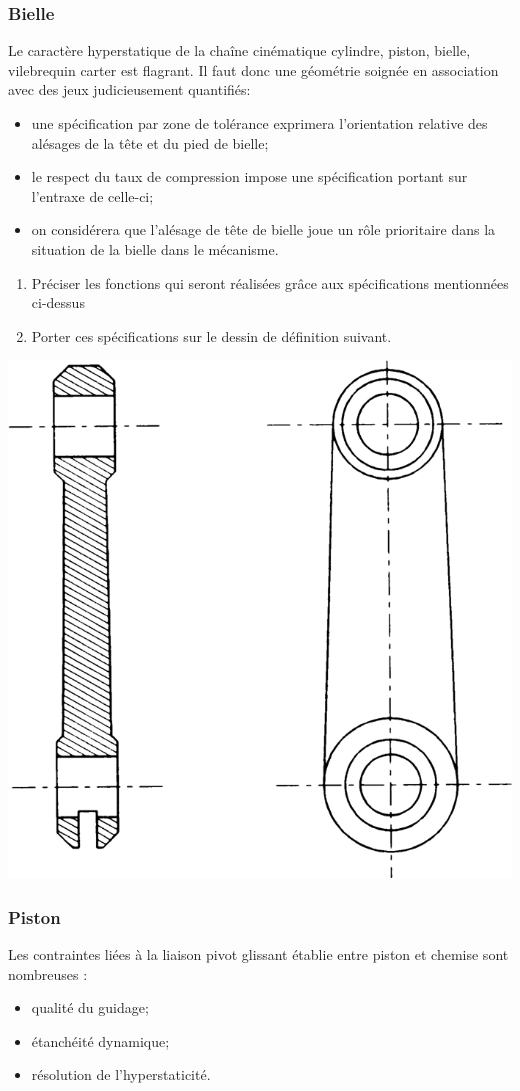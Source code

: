 \documentclass[11pt,oneside]{article}
\begin{document}
\newpage
\subsubsection{Bielle}
Le caractère hyperstatique de la chaîne cinématique cylindre, piston, bielle, vilebrequin carter est flagrant. Il faut donc une géométrie soignée en association avec des jeux judicieusement quantifiés:
\begin{itemize}
\item une spécification par zone de tolérance exprimera l’orientation relative des alésages de la tête et du pied de bielle;
\item le respect du taux de compression impose une spécification portant sur l’entraxe de celle-ci;
\item on considérera que l’alésage de tête de bielle joue un rôle prioritaire dans la situation de la bielle dans le mécanisme.
\end{itemize}

\begin{enumerate}
\item Préciser les fonctions qui seront réalisées grâce aux spécifications mentionnées ci-dessus
\item Porter ces spécifications sur le dessin de définition suivant.
\end{enumerate}

\begin{center}
\includegraphics[width=.55\textwidth]{png/bielle}
\end{center}

\newpage
\subsubsection{Piston}
Les contraintes liées à la liaison pivot glissant établie entre piston et chemise sont nombreuses : 
\begin{itemize}
\item qualité du guidage;
\item étanchéité dynamique;
\item résolution de l’hyperstaticité.
\end{itemize}
\end{document}
